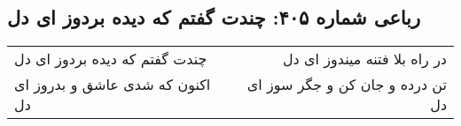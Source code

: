 \begin{center}
\section*{رباعی شماره ۴۰۵: چندت گفتم که دیده بردوز ای دل}
\label{sec:sh405}
\begin{longtable}{l p{0.5cm} r}
چندت گفتم که دیده بردوز ای دل
&&
در راه بلا فتنه میندوز ای دل
\\
اکنون که شدی عاشق و بدروز ای دل
&&
تن درده و جان کن و جگر سوز ای دل
\\
\end{longtable}
\end{center}
